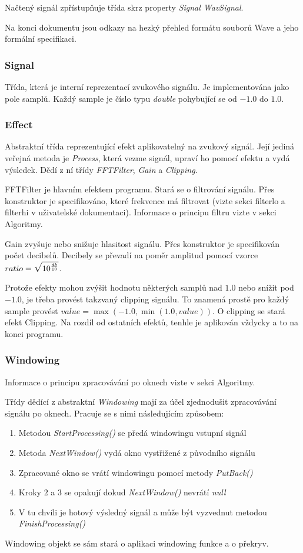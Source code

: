 \documentclass{article}
\begin{document}
Načtený signál zpřístupňuje třída skrz property \emph{Signal WavSignal}.

Na konci dokumentu jsou odkazy na hezký přehled formátu souborů
Wave\cite{wav-prehled} a jeho formální specifikaci\cite{wav-spec}.

\subsubsection*{Signal}
Třída, která je interní reprezentací zvukového signálu. Je implementována jako
pole samplů. Každý sample je číslo typu \emph{double} pohybující se od $-1.0$
do $1.0$.

\subsubsection*{Effect}
Abstraktní třída reprezentující efekt aplikovatelný na zvukový signál. Její
jediná veřejná metoda je \emph{Process}, která vezme signál, upraví ho pomocí
efektu a vydá výsledek. Dědí z ní třídy \emph{FFTFilter}, \emph{Gain} a
\emph{Clipping}.

FFTFilter je hlavním efektem programu. Stará se o filtrování signálu. Přes
konstruktor je specifikováno, které frekvence má filtrovat (vizte sekci
filterlo a filterhi v uživatelské dokumentaci). Informace o principu filtru
vizte v sekci Algoritmy.

Gain zvyšuje nebo snižuje hlasitost signálu. Přes konstruktor je specifikován
počet decibelů. Decibely se převadí na poměr amplitud pomocí vzorce $ratio =
\sqrt{10^{db \over 10}}$.

Protože efekty mohou zvýšit hodnotu některých samplů nad $1.0$ nebo snížit pod
$-1.0$, je třeba provést takzvaný clipping signálu. To znamená prostě pro každý
sample provést \linebreak $value = \max(-1.0, \min(1.0, value))$. O clipping se
stará efekt Clipping. Na rozdíl od ostatních efektů, tenhle je aplikován
vždycky a to na konci programu.

\subsubsection*{Windowing}
Informace o principu zpracovávání po oknech vizte v sekci Algoritmy.

Třídy dědící z abstraktní \emph{Windowing} mají za účel zjednodušit
zpracovávání signálu po oknech. Pracuje se s nimi následujícím způsobem:
\begin{enumerate}
	\item	Metodou \emph{StartProcessing()} se předá windowingu vstupní
		signál
	\item	Metoda \emph{NextWindow()} vydá okno vystřižené z původního
		signálu
	\item	Zpracované okno se vrátí windowingu pomocí metody
		\emph{PutBack()}
	\item	Kroky $2$ a $3$ se opakují dokud \emph{NextWindow()} nevrátí
		\emph{null}
	\item	V tu chvíli je hotový výsledný signál a může být vyzvednut
		metodou \emph{FinishProcessing()}
\end{enumerate}
Windowing objekt se sám stará o aplikaci windowing funkce a o překryv.
\end{document}
